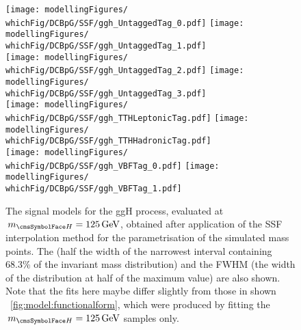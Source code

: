 \ifNewAnalysis
\else
\begin{figure}[htp!]
\centering
\texttt{[image: modellingFigures/\\whichFig/DCBpG/SSF/ggh\_UntaggedTag\_0.pdf]} 
\texttt{[image: modellingFigures/\\whichFig/DCBpG/SSF/ggh\_UntaggedTag\_1.pdf]} \\
\texttt{[image: modellingFigures/\\whichFig/DCBpG/SSF/ggh\_UntaggedTag\_2.pdf]} 
\texttt{[image: modellingFigures/\\whichFig/DCBpG/SSF/ggh\_UntaggedTag\_3.pdf]} \\ 
\texttt{[image: modellingFigures/\\whichFig/DCBpG/SSF/ggh\_TTHLeptonicTag.pdf]} 
\texttt{[image: modellingFigures/\\whichFig/DCBpG/SSF/ggh\_TTHHadronicTag.pdf]} \\ 
\texttt{[image: modellingFigures/\\whichFig/DCBpG/SSF/ggh\_VBFTag\_0.pdf]} 
\texttt{[image: modellingFigures/\\whichFig/DCBpG/SSF/ggh\_VBFTag\_1.pdf]} \\

\caption{The signal models for the ggH process, evaluated at $\mH=125\GeV$, obtained after application of the SSF interpolation method for the \DCBpG parametrisation of the simulated mass points. The \effSigma (half the width of the narrowest interval containing 68.3\% of the invariant mass distribution) and the FWHM (the width of the distribution at half of the maximum value) are also shown. Note that the fits here maybe differ slightly from those in shown \Fig~\ref{fig:model:functionalform}, which were produced by fitting the $\mH=125\GeV$ samples only.}

\label{fig:model:sig_model_per_ggh}
\end{figure}

